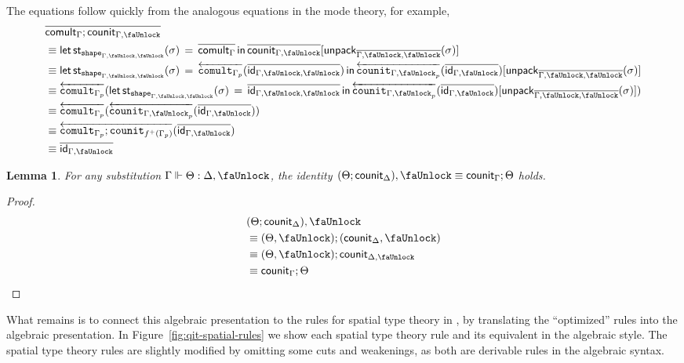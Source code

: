 \documentclass[10pt]{article}
\newtheorem{lemma}{Lemma}
\theoremstyle{definition}
\newcommand{\id}{\mathsf{id}}
\newcommand{\rewrite}[2]{\overleftarrow{#1}(#2)}
\newcommand\StI[2]{\ensuremath{\mathsf{st}_{#1}(#2)}}
\newcommand\StE[4]{\ensuremath{\mathsf{let} \, \StI{#1}{#3} \, = \, {#2} \, \mathsf{in} \, #4}}
\newcommand\TrPlus[2]{\ensuremath{{#1}^+(#2)}}
\newcommand\unpack[2]{\ensuremath{\mathsf{unpack}_{#1}(#2)}}
\newcommand{\modeof}[1]{{#1}_p}
\newcommand{\tshape}[1]{\ensuremath{\mathtt{shape}_{#1}}}
\newcommand{\qyields}{\Vdash}
\newcommand{\upstairs}[1]{\overline{#1}}
\newcommand{\lock}{\text{\faUnlock}}
\newcommand\fcomult[1]{\ensuremath{\mathtt{comult}_{#1}}}
\newcommand\fcounit[1]{\ensuremath{\mathtt{counit}_{#1}}}
\newcommand{\counit}[1]{\mathsf{counit}_{#1}}
\newcommand{\comult}[1]{\mathsf{comult}_{#1}}
\begin{document}
The equations follow quickly from the analogous equations in the mode theory, for example, 
\begin{align*}
&\upstairs{\comult{\Gamma} ; \counit{\Gamma, \lock}} \\
&\equiv \StE{\tshape{\Gamma, \lock, \lock}}{\upstairs{\comult{\Gamma}}}{\sigma}{\upstairs{\counit{\Gamma, \lock}}[\unpack{\upstairs{\Gamma, \lock, \lock}}{\sigma}]} \\
&\equiv \StE{\tshape{\Gamma, \lock, \lock}}{\rewrite{\fcomult{\modeof{\Gamma}}}{\upstairs{\id_{\Gamma, \lock, \lock}}}}{\sigma}{\rewrite{\fcounit{\modeof{\Gamma, \lock}}}{\upstairs{\id_{\Gamma, \lock}}}[\unpack{\upstairs{\Gamma, \lock, \lock}}{\sigma}]} \\
&\equiv \rewrite{\fcomult{\modeof{\Gamma}}}{\StE{\tshape{\Gamma, \lock, \lock}}{\upstairs{\id_{\Gamma, \lock, \lock}}}{\sigma}{\rewrite{\fcounit{\modeof{\Gamma, \lock}}}{\upstairs{\id_{\Gamma, \lock}}}[\unpack{\upstairs{\Gamma, \lock, \lock}}{\sigma}]}} \\
&\equiv \rewrite{\fcomult{\modeof{\Gamma}}}{\rewrite{\fcounit{\modeof{\Gamma, \lock}}}{\upstairs{\id_{\Gamma, \lock}}}} \\
&\equiv \rewrite{\fcomult{\modeof{\Gamma}};\fcounit{\TrPlus{f}{\modeof{\Gamma}}}}{\upstairs{\id_{\Gamma, \lock}}} \\
&\equiv \upstairs{\id_{\Gamma, \lock}}
\end{align*}

\begin{lemma}
For any substitution $\Gamma \qyields \Theta : \Delta, \lock$, the identity $(\Theta ; \counit{\Delta}), \lock \equiv \counit{\Gamma} ; \Theta$ holds.
\end{lemma}
\begin{proof}
\begin{align*}
&(\Theta ; \counit{\Delta}), \lock \\
&\equiv (\Theta, \lock) ; (\counit{\Delta}, \lock) \\
&\equiv (\Theta, \lock) ; \counit{\Delta, \lock}\\
&\equiv \counit{\Gamma} ; \Theta
\end{align*}
\end{proof}

What remains is to connect this algebraic presentation to the rules for
spatial type theory in \citet{shulman15realcohesion}, by translating the
``optimized'' rules into the algebraic presentation.  In
Figure~\ref{fig:qit-spatial-rules} we show each spatial type theory rule
and its equivalent in the algebraic style.  The spatial type theory
rules are slightly modified by omitting some cuts and weakenings, as
both are derivable rules in the algebraic syntax.
\end{document}
